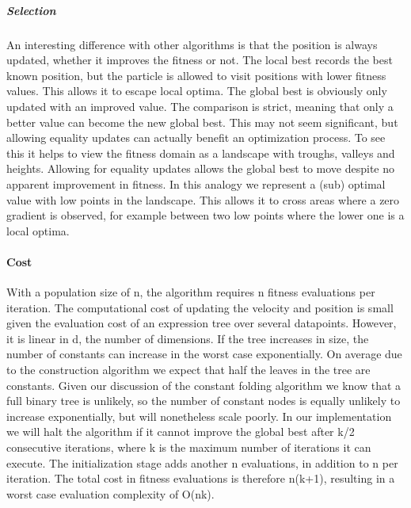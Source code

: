 \subparagraph{Selection}
An interesting difference with other algorithms is that the position is always updated, whether it improves the fitness or not. The local best records the best known position, but the particle is allowed to visit positions with lower fitness values. This allows it to escape local optima. The global best is obviously only updated with an improved value. The comparison is strict, meaning that only a better value can become the new global best. This may not seem significant, but allowing equality updates can actually benefit an optimization process. To see this it helps to view the fitness domain as a landscape with troughs, valleys and heights. Allowing for equality updates allows the global best to move despite no apparent improvement in fitness. In this analogy we represent a (sub) optimal value with low points in the landscape.
This allows it to cross areas where a zero gradient is observed, for example between two low points where the lower one is a local optima. 

\paragraph{Cost}\label{psocost}
With a population size of n, the algorithm requires n fitness evaluations per iteration. The computational cost of updating the velocity and position is small given the evaluation cost of an expression tree over several datapoints. However, it is linear in d, the number of dimensions. If the tree increases in size, the number of constants can increase in the worst case exponentially. On average due to the construction algorithm we expect that half the leaves in the tree are constants. Given our discussion of the constant folding algorithm we know that a full binary tree is unlikely, so the number of constant nodes is equally unlikely to increase exponentially, but will nonetheless scale poorly.
In our implementation we will halt the algorithm if it cannot improve the global best after k/2 consecutive iterations, where k is the maximum number of iterations it can execute. The initialization stage adds another n evaluations, in addition to n per iteration. The total cost in fitness evaluations is therefore n(k+1), resulting in a worst case evaluation complexity of O(nk).

